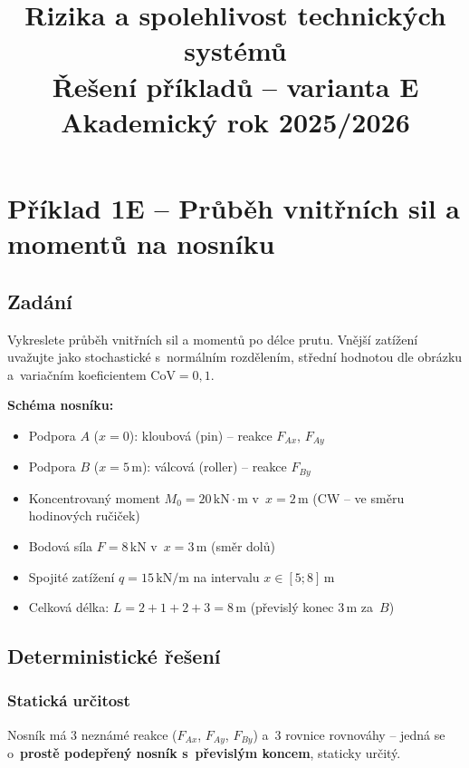 \documentclass[a4paper,11pt]{article}
\title{%
    \vspace{-1cm}
    \textbf{Rizika a spolehlivost technických systémů}\\[0.3cm]
    \Large Řešení příkladů -- varianta E\\[0.2cm]
    \large Akademický rok 2025/2026
}
\author{}
\date{}
\newcommand{\unit}[1]{\,\mathrm{#1}}
\begin{document}
\maketitle
\thispagestyle{fancy}

\tableofcontents
\newpage

\section{Příklad 1E -- Průběh vnitřních sil a momentů na nosníku}

\subsection{Zadání}

Vykreslete průběh vnitřních sil a momentů po délce prutu. Vnější zatížení uvažujte jako stochastické s~normálním rozdělením, střední hodnotou dle obrázku a~variačním koeficientem $\mathrm{CoV} = 0{,}1$.

\medskip\noindent
\textbf{Schéma nosníku:}
\begin{itemize}[nosep]
    \item Podpora $A$ ($x=0$): kloubová (pin) -- reakce $F_{Ax}$, $F_{Ay}$
    \item Podpora $B$ ($x = 5\unit{m}$): válcová (roller) -- reakce $F_{By}$
    \item Koncentrovaný moment $M_0 = 20\unit{kN \cdot m}$ v~$x = 2\unit{m}$ (CW -- ve směru hodinových ručiček)
    \item Bodová síla $F = 8\unit{kN}$ v~$x = 3\unit{m}$ (směr dolů)
    \item Spojité zatížení $q = 15\unit{kN/m}$ na intervalu $x \in [5; 8]\unit{m}$
    \item Celková délka: $L = 2 + 1 + 2 + 3 = 8\unit{m}$ (převislý konec 3\,m za~$B$)
\end{itemize}

\subsection{Deterministické řešení}

\subsubsection{Statická určitost}

Nosník má 3 neznámé reakce ($F_{Ax}$, $F_{Ay}$, $F_{By}$) a~3 rovnice rovnováhy -- jedná se o~\textbf{prostě podepřený nosník s~převislým koncem}, staticky určitý.
\end{document}
